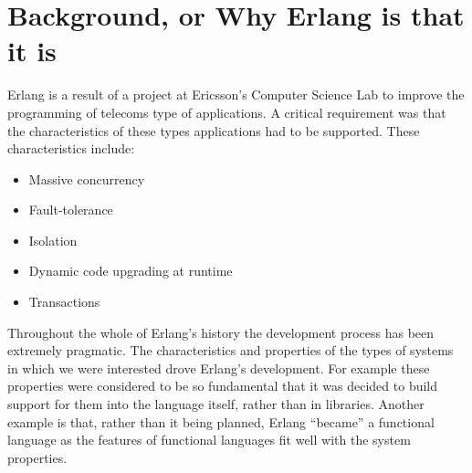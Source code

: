 \chapter{Background, or Why Erlang is that it is}
\label{background}

Erlang is a result of a project at Ericsson's Computer Science Lab to
improve the programming of telecoms type of applications. A critical
requirement was that the characteristics of these types applications
had to be supported. These characteristics include:

\begin{itemize}
\item Massive concurrency

\item Fault-tolerance

\item Isolation

\item Dynamic code upgrading at runtime

\item Transactions
\end{itemize}

Throughout the whole of Erlang's history the development process has
been extremely pragmatic. The characteristics and properties of the
types of systems in which we were interested drove Erlang's
development. For example these properties were considered to be so
fundamental that it was decided to build support for them into the
language itself, rather than in libraries. Another example is that,
rather than it being planned, Erlang ``became'' a functional language
as the features of functional languages fit well with the system
properties.
